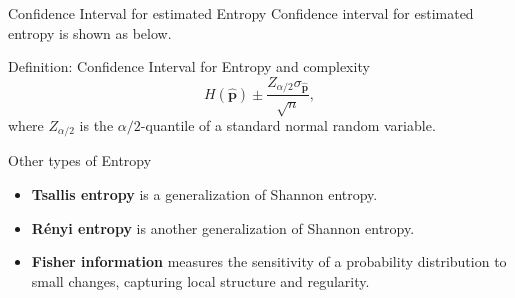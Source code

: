 \documentclass{beamer}
\begin{document}

\begin{frame}{Confidence Interval for estimated Entropy}
	Confidence interval for estimated entropy is shown as below.
	\begin{block}{Definition: Confidence Interval for Entropy and complexity}
			\[
			H(\widehat{\mathbf{p}})\pm \dfrac{Z_{\alpha/2}\sigma_{\widehat{\mathbf{p}}}}{\sqrt{n}},
				\label{eq:ConfidenceInterval}
			\]
			where $Z_{\alpha/2}$ is the $\alpha/2$-quantile of a standard normal random variable.
			\end{block} 
\end{frame}

\begin{frame}{Other types of Entropy}
	\begin{itemize}
		\item \textbf{Tsallis entropy} is a generalization of Shannon entropy.
		\item \textbf{Rényi entropy} is another generalization of Shannon entropy.
		\item \textbf{Fisher information} measures the sensitivity of a probability distribution to small changes, capturing local structure and regularity. 
	\end{itemize}
\end{frame}
\end{document}
